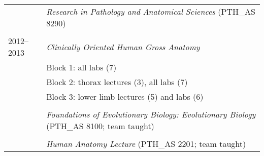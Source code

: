 \begin{longtable}{@{}lX@{}}
    \\
    & \textit{Research in Pathology and Anatomical Sciences} (PTH\_AS 8290)\\
    \\
    2012--2013 & \textit{Clinically Oriented Human Gross Anatomy}\\
    & Block 1: all labs (7)\\
    & Block 2: thorax lectures (3), all labs (7)\\
    & Block 3: lower limb lectures (5) and labs (6)\\
    \\
    & \textit{Foundations of Evolutionary Biology: Evolutionary Biology} (PTH\_AS 8100; team taught)\\
    \\
    & \textit{Human Anatomy Lecture} (PTH\_AS 2201; team taught)\\
\end{longtable}
